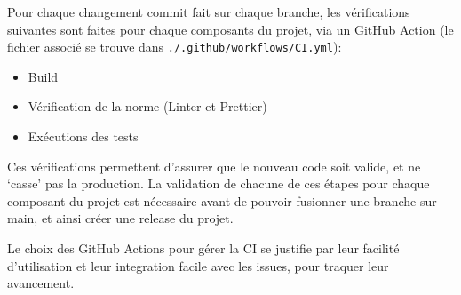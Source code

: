 Pour chaque changement commit fait sur chaque branche, les vérifications suivantes sont faites pour chaque composants du projet, via un GitHub Action (le fichier associé se trouve dans \verb|./.github/workflows/CI.yml|):

\begin{itemize}
	\item Build
	\item Vérification de la norme (Linter et Prettier)
	\item Exécutions des tests
\end{itemize}


Ces vérifications permettent d’assurer que le nouveau code soit valide, et ne ‘casse’ pas la production.
La validation de chacune de ces étapes pour chaque composant du projet est nécessaire avant de pouvoir fusionner une branche sur main, et ainsi créer une release du projet.

Le choix des GitHub Actions pour gérer la CI se justifie par leur facilité d'utilisation et leur integration facile avec les issues, pour traquer leur avancement.